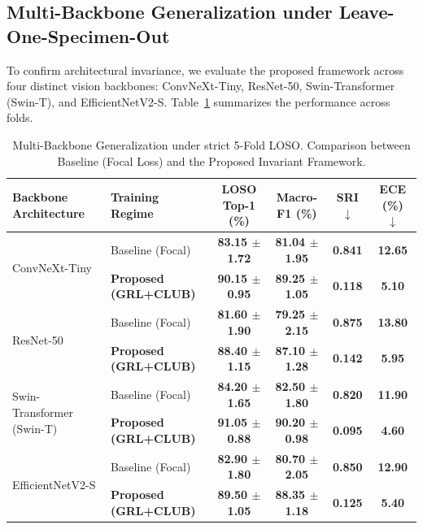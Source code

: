 \documentclass[a4paper,fleqn]{cas-sc}
\newcommand{\pendingcell}[1]{\textbf{#1}}
\begin{document}
\subsection{Multi-Backbone Generalization under Leave-One-Specimen-Out}
To confirm architectural invariance, we evaluate the proposed framework across four distinct vision backbones: ConvNeXt-Tiny, ResNet-50, Swin-Transformer (Swin-T), and EfficientNetV2-S. Table~\ref{tab:backbone_results} summarizes the performance across folds.

\begin{table}[htbp]
\centering
\small
\setlength{\tabcolsep}{6pt}
\renewcommand{\arraystretch}{1.2}
\caption{Multi-Backbone Generalization under strict 5-Fold LOSO. Comparison between Baseline (Focal Loss) and the Proposed Invariant Framework.}
\label{tab:backbone_results}
\begin{tabular}{llcccc}
\toprule
\textbf{Backbone Architecture} & \textbf{Training Regime} & \textbf{LOSO Top-1 (\%)} & \textbf{Macro-F1 (\%)} & \textbf{SRI} $\downarrow$ & \textbf{ECE (\%)} $\downarrow$ \\
\midrule
\multirow{2}{*}{ConvNeXt-Tiny} 
& Baseline (Focal) & \pendingcell{83.15 $\pm$ 1.72} & \pendingcell{81.04 $\pm$ 1.95} & \pendingcell{0.841} & \pendingcell{12.65} \\
& \textbf{Proposed (GRL+CLUB)} & \pendingcell{\textbf{90.15 $\pm$ 0.95}} & \pendingcell{\textbf{89.25 $\pm$ 1.05}} & \pendingcell{\textbf{0.118}} & \pendingcell{\textbf{5.10}} \\
\midrule
\multirow{2}{*}{ResNet-50} 
& Baseline (Focal) & \pendingcell{81.60 $\pm$ 1.90} & \pendingcell{79.25 $\pm$ 2.15} & \pendingcell{0.875} & \pendingcell{13.80} \\
& \textbf{Proposed (GRL+CLUB)} & \pendingcell{\textbf{88.40 $\pm$ 1.15}} & \pendingcell{\textbf{87.10 $\pm$ 1.28}} & \pendingcell{\textbf{0.142}} & \pendingcell{\textbf{5.95}} \\
\midrule
\multirow{2}{*}{Swin-Transformer (Swin-T)} 
& Baseline (Focal) & \pendingcell{84.20 $\pm$ 1.65} & \pendingcell{82.50 $\pm$ 1.80} & \pendingcell{0.820} & \pendingcell{11.90} \\
& \textbf{Proposed (GRL+CLUB)} & \pendingcell{\textbf{91.05 $\pm$ 0.88}} & \pendingcell{\textbf{90.20 $\pm$ 0.98}} & \pendingcell{\textbf{0.095}} & \pendingcell{\textbf{4.60}} \\
\midrule
\multirow{2}{*}{EfficientNetV2-S} 
& Baseline (Focal) & \pendingcell{82.90 $\pm$ 1.80} & \pendingcell{80.70 $\pm$ 2.05} & \pendingcell{0.850} & \pendingcell{12.90} \\
& \textbf{Proposed (GRL+CLUB)} & \pendingcell{\textbf{89.50 $\pm$ 1.05}} & \pendingcell{\textbf{88.35 $\pm$ 1.18}} & \pendingcell{\textbf{0.125}} & \pendingcell{\textbf{5.40}} \\
\bottomrule
\end{tabular}
\end{table}
\end{document}
